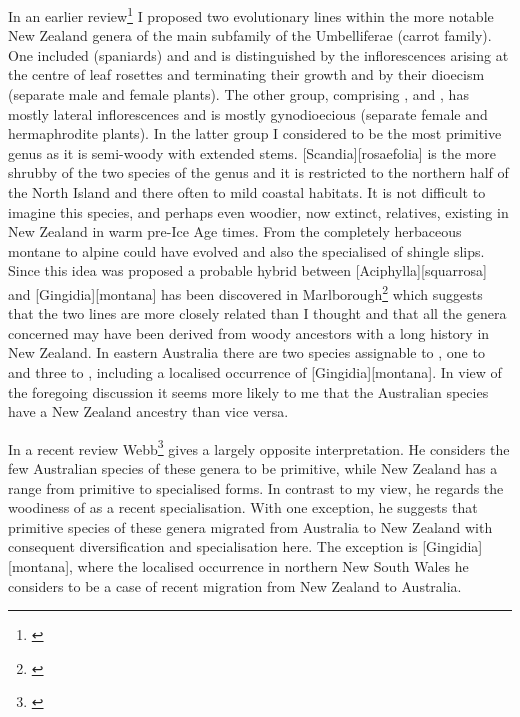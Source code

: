 In an earlier review\footnote{\cite{dawson1971relationships}} I proposed two evolutionary lines within the more notable New Zealand genera of the main subfamily of the Umbelliferae (carrot family).
One included  (spaniards) and  and is distinguished by the inflorescences arising at the centre of leaf rosettes and terminating their growth and by their dioecism (separate male and female plants).
The other group, comprising ,  and , has mostly lateral inflorescences and is mostly gynodioecious (separate female and hermaphrodite plants).
In the latter group I considered  to be the most primitive genus as it is semi-woody with extended stems. [Scandia][rosaefolia] is the more shrubby of the two species of the genus and it is restricted to the northern half of the North Island and there often to mild coastal habitats.
It is not difficult to imagine this species, and perhaps even woodier, now extinct, relatives, existing in New Zealand in warm pre-Ice Age times.
From  the completely herbaceous montane to alpine  could have evolved and also the specialised  of shingle slips.
Since this idea was proposed a probable hybrid between [Aciphylla][squarrosa] and [Gingidia][montana] has been discovered in Marlborough\footnote{\cite{webb1984natural}} which suggests that the two lines are more closely related than I thought and that all the genera concerned may have been derived from woody ancestors with a long history in New Zealand.
In eastern Australia there are two species assignable to , one to  and three to , including a localised occurrence of [Gingidia][montana].
In view of the foregoing discussion it seems more likely to me that the Australian species have a New Zealand ancestry than vice versa.

In a recent review Webb\footnote{\cite{webb1986breeding}} gives a largely opposite interpretation.
He considers the few Australian species of these genera to be primitive, while New Zealand has a range from primitive to specialised forms.
In contrast to my view, he regards the woodiness of  as a recent specialisation.
With one exception, he suggests that primitive species of these genera migrated from Australia to New Zealand with consequent diversification and specialisation here.
The exception is [Gingidia][montana], where the localised occurrence in northern New South Wales he considers to be a case of recent migration from New Zealand to Australia.

